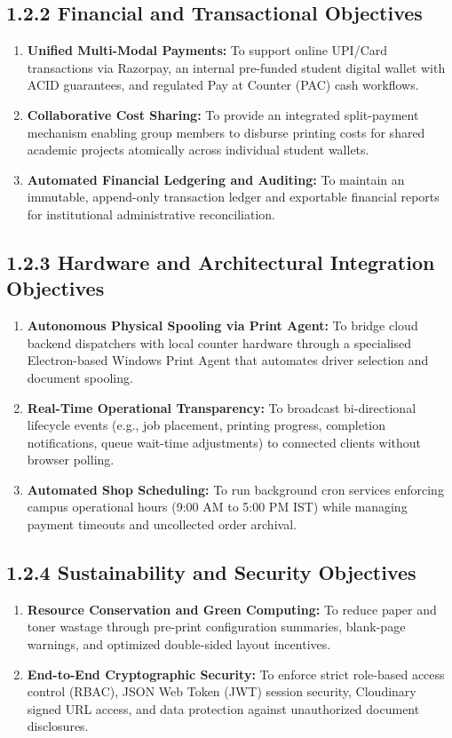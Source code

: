 \documentclass[12pt,a4paper,oneside]{report}
\begin{document}
\subsection{1.2.2 Financial and Transactional Objectives}
\begin{enumerate}[leftmargin=0.35in, itemsep=2pt]
  \item \textbf{Unified Multi-Modal Payments:} To support online UPI/Card transactions via Razorpay, an internal pre-funded student digital wallet with ACID guarantees, and regulated Pay at Counter (PAC) cash workflows.
  \item \textbf{Collaborative Cost Sharing:} To provide an integrated split-payment mechanism enabling group members to disburse printing costs for shared academic projects atomically across individual student wallets.
  \item \textbf{Automated Financial Ledgering and Auditing:} To maintain an immutable, append-only transaction ledger and exportable financial reports for institutional administrative reconciliation.
\end{enumerate}

\subsection{1.2.3 Hardware and Architectural Integration Objectives}
\begin{enumerate}[leftmargin=0.35in, itemsep=2pt]
  \item \textbf{Autonomous Physical Spooling via Print Agent:} To bridge cloud backend dispatchers with local counter hardware through a specialised Electron-based Windows Print Agent that automates driver selection and document spooling.
  \item \textbf{Real-Time Operational Transparency:} To broadcast bi-directional lifecycle events (e.g., job placement, printing progress, completion notifications, queue wait-time adjustments) to connected clients without browser polling.
  \item \textbf{Automated Shop Scheduling:} To run background cron services enforcing campus operational hours (9:00 AM to 5:00 PM IST) while managing payment timeouts and uncollected order archival.
\end{enumerate}

\subsection{1.2.4 Sustainability and Security Objectives}
\begin{enumerate}[leftmargin=0.35in, itemsep=2pt]
  \item \textbf{Resource Conservation and Green Computing:} To reduce paper and toner wastage through pre-print configuration summaries, blank-page warnings, and optimized double-sided layout incentives.
  \item \textbf{End-to-End Cryptographic Security:} To enforce strict role-based access control (RBAC), JSON Web Token (JWT) session security, Cloudinary signed URL access, and data protection against unauthorized document disclosures.
\end{enumerate}
\end{document}
